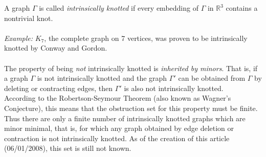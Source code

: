 \documentclass[12pt]{article}
\begin{document}
A graph $\Gamma$ is called \emph{intrinsically knotted} if every embedding of $\Gamma$ in $\mathbb{R}^3$ contains a nontrivial knot.
\\
\\\emph{Example:} $K_7$, the complete graph on 7 vertices, was proven to be intrinsically knotted by Conway and Gordon.
\\
\\The property of being \emph{not} intrinsically knotted is \emph{inherited by minors}. That is, if a graph $\Gamma$ is not intrinsically knotted and the graph $\Gamma'$ can be obtained from $\Gamma$ by deleting or contracting edges, then $\Gamma'$ is also not intrinsically knotted.
\\According to the Robertson-Seymour Theorem (also known as Wagner's Conjecture), this means that the obstruction set for this property must be finite. Thus there are only a finite number of intrinsically knotted graphs which are minor minimal, that is, for which any graph obtained by edge deletion or contraction is not intrinsically knotted. As of the creation of this article (06/01/2008), this set is still not known.
\end{document}
